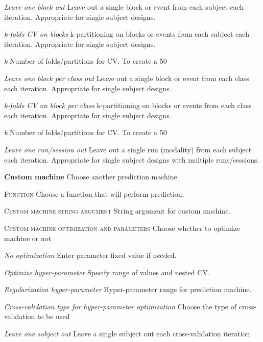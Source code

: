 \textit{Leave one block out}
Leave out a single block or event from each subject each iteration. Appropriate for single subject designs.


\textit{k-folds CV on blocks}
k-partitioning on blocks or events from each subject each iteration. Appropriate for single subject designs.


\textit{k}
Number of folds/partitions for CV. To create a 50%


\textit{Leave one block per class out}
Leave out a single block or event from each class each iteration. Appropriate for single subject designs.


\textit{k-folds CV on block per class}
k-partitioning on blocks or events from each class each iteration. Appropriate for single subject designs.


\textit{k}
Number of folds/partitions for CV. To create a 50%


\textit{Leave one run/session out}
Leave out a single run (modality) from each subject each iteration. Appropriate for single subject designs with multiple runs/sessions.


\textbf{Custom machine}
Choose another prediction machine


\textsc{Function}
Choose a function that will perform prediction.


\textsc{Custom machine string argument}
String argument for custom machine.


\textsc{Custom machine optimization and parameters}
Choose whether to optimize machine or not


\textsl{No optimization}
Enter parameter fixed value if needed.


\textsl{Optimize hyper-parameter}
Specify range of values and nested CV.


\textit{Regularization hyper-parameter}
Hyper-parameter range for prediction machine.


\textit{Cross-validation type for hyper-parameter optimization}
Choose the type of cross-validation to be used


\textit{Leave one subject out}
Leave a single subject out each cross-validation iteration



